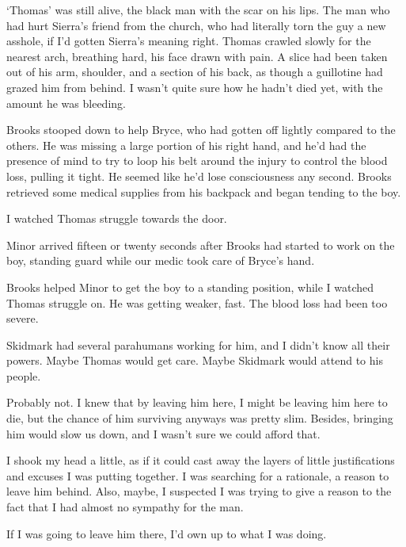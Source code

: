`Thomas' was still alive, the black man with the scar on his lips.  The man who had hurt Sierra's friend from the church, who had literally torn the guy a new asshole, if I'd gotten Sierra's meaning right.  Thomas crawled slowly for the nearest arch, breathing hard, his face drawn with pain.  A slice had been taken out of his arm, shoulder, and a section of his back, as though a guillotine had grazed him from behind.  I wasn't quite sure how he hadn't died yet, with the amount he was bleeding.



Brooks stooped down to help Bryce, who had gotten off lightly compared to the others.  He was missing a large portion of his right hand, and he'd had the presence of mind to try to loop his belt around the injury to control the blood loss, pulling it tight.  He seemed like he'd lose consciousness any second.  Brooks retrieved some medical supplies from his backpack and began tending to the boy.



I watched Thomas struggle towards the door.



Minor arrived fifteen or twenty seconds after Brooks had started to work on the boy, standing guard while our medic took care of Bryce's hand.



Brooks helped Minor to get the boy to a standing position, while I watched Thomas struggle on.  He was getting weaker, fast.  The blood loss had been too severe.



Skidmark had several parahumans working for him, and I didn't know all their powers.  Maybe Thomas would get care.  Maybe Skidmark would attend to his people.



Probably not.  I knew that by leaving him here, I might be leaving him here to die, but the chance of him surviving anyways was pretty slim. Besides, bringing him would slow us down, and I wasn't sure we could afford that.



I shook my head a little, as if it could cast away the layers of little justifications and excuses I was putting together.  I was searching for a rationale, a reason to leave him behind.  Also, maybe, I suspected I was trying to give a reason to the fact that I had almost no sympathy for the man.



If I was going to leave him there, I'd own up to what I was doing.



